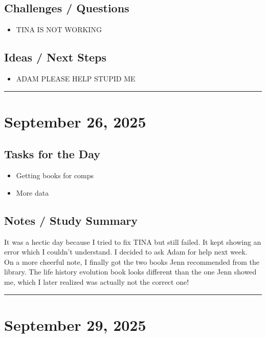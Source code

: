 \documentclass[12pt]{article}
\begin{document}
\subsection*{Challenges / Questions}
\begin{itemize}
    \item TINA IS NOT WORKING
\end{itemize}

\subsection*{Ideas / Next Steps}
\begin{itemize}
    \item ADAM PLEASE HELP STUPID ME
\end{itemize}

\vspace{1em}
\hrule
\vspace{1em}
\section*{September 26, 2025}

\subsection*{Tasks for the Day}
\begin{itemize}
    \item Getting books for comps
    \item More data
\end{itemize}
\subsection*{Notes / Study Summary}
It was a hectic day because I tried to fix TINA but still failed. It kept showing an error which I couldn't understand. I decided to ask Adam for help next week.\\
On a more cheerful note, I finally got the two books Jenn recommended from the library. The life history evolution book looks different than the one Jenn showed me, which I later realized was actually not the correct one!

\vspace{1em}
\hrule
\vspace{1em}

\section*{September 29, 2025}
\end{document}
